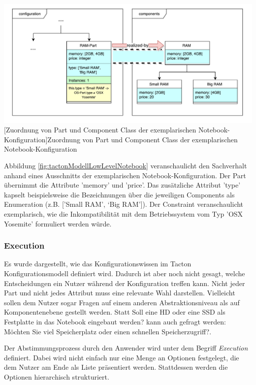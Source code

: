 \documentclass[11pt, a4paper, titlepage, listof=totoc, bibliography=totoc, index=totoc, twoside, openright, headings=normal, draft]{scrreprt}
\begin{document}
\vspace{1em}
\begin{minipage}{\linewidth}
	\centering
	\includegraphics[width=0.9\linewidth]{Abbildungen/tactonModellLowLevelNotebook.pdf}
	[Zuordnung von Part und Component Class der exemplarischen Notebook-Konfiguration]{Zuordnung von Part und Component Class der exemplarischen Notebook-Konfiguration}
	\label{fig:tactonModellLowLevelNotebook}
\end{minipage}

Abbildung \ref{fig:tactonModellLowLevelNotebook} veranschaulicht den Sachverhalt anhand eines Ausschnitts der exemplarischen Notebook-Konfiguration.  Der Part übernimmt die Attribute 'memory' und 'price'. Das zusätzliche Attribut 'type' kapselt beispielsweise die Bezeichnungen über die jeweiligen Components als Enumeration (z.B. ['Small RAM', ‘Big RAM']). Der Constraint veranschaulicht exemplarisch, wie die Inkompatibilität mit dem Betriebssystem vom Typ 'OSX Yosemite' formuliert werden würde.

\subsubsection{Execution}
\label{Execution}
Es wurde dargestellt, wie das Konfigurationswissen im Tacton Konfigurationsmodell definiert wird. Dadurch ist aber noch nicht gesagt, welche Entscheidungen ein Nutzer während der Konfiguration treffen kann. Nicht jeder Part und nicht jedes Attribut muss eine relevante Wahl darstellen. Vielleicht sollen dem Nutzer sogar Fragen auf einem anderen Abstraktionsniveau als auf Komponentenebene gestellt werden. Statt \glqq Soll eine HD oder eine SSD als Festplatte in das Notebook eingebaut werden?\grqq{} kann auch gefragt werden: \glqq Möchten Sie viel Speicherplatz oder einen schnellen Speicherzugriff?\grqq.

Der Abstimmungsprozess durch den Anwender wird unter dem Begriff \emph{Execution} definiert. Dabei wird nicht einfach nur eine Menge an Optionen festgelegt, die dem Nutzer am Ende als Liste präsentiert werden. Stattdessen werden die Optionen hierarchisch strukturiert.
\end{document}

